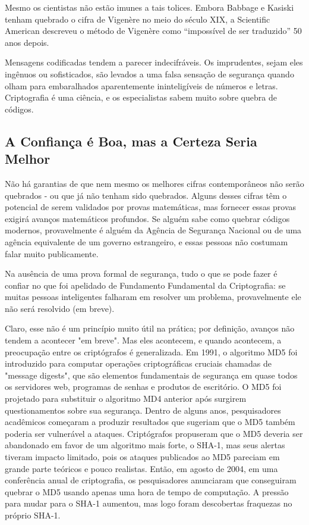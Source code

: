 \documentclass{book}
\begin{document}
Mesmo os cientistas não estão imunes a tais tolices. Embora Babbage e Kasiski tenham quebrado o cifra de Vigenère no meio do século XIX, a Scientific American descreveu o método de Vigenère como ``impossível de ser traduzido'' 50 anos depois.

Mensagens codificadas tendem a parecer indecifráveis. Os imprudentes, sejam eles ingênuos ou sofisticados, são levados a uma falsa sensação de segurança quando olham para embaralhados aparentemente ininteligíveis de números e letras. Criptografia é uma ciência, e os especialistas sabem muito sobre quebra de códigos.


\subsection{A Confiança é Boa, mas a Certeza Seria Melhor}
\label{segredos:confianca}

Não há garantias de que nem mesmo os melhores cifras contemporâneos não serão quebrados - ou que já não tenham sido quebrados. Alguns desses cifras têm o potencial de serem validados por provas matemáticas, mas fornecer essas provas exigirá avanços matemáticos profundos. Se alguém sabe como quebrar códigos modernos, provavelmente é alguém da Agência de Segurança Nacional ou de uma agência equivalente de um governo estrangeiro, e essas pessoas não costumam falar muito publicamente.

Na ausência de uma prova formal de segurança, tudo o que se pode fazer é confiar no que foi apelidado de Fundamento Fundamental da Criptografia: se muitas pessoas inteligentes falharam em resolver um problema, provavelmente ele não será resolvido (em breve).

Claro, esse não é um princípio muito útil na prática; por definição, avanços não tendem a acontecer "em breve". Mas eles acontecem, e quando acontecem, a preocupação entre os criptógrafos é generalizada. Em 1991, o algoritmo MD5 foi introduzido para computar operações criptográficas cruciais chamadas de "message digests", que são elementos fundamentais de segurança em quase todos os servidores web, programas de senhas e produtos de escritório. O MD5 foi projetado para substituir o algoritmo MD4 anterior após surgirem questionamentos sobre sua segurança. Dentro de alguns anos, pesquisadores acadêmicos começaram a produzir resultados que sugeriam que o MD5 também poderia ser vulnerável a ataques. Criptógrafos propuseram que o MD5 deveria ser abandonado em favor de um algoritmo mais forte, o SHA-1, mas seus alertas tiveram impacto limitado, pois os ataques publicados ao MD5 pareciam em grande parte teóricos e pouco realistas. Então, em agosto de 2004, em uma conferência anual de criptografia, os pesquisadores anunciaram que conseguiram quebrar o MD5 usando apenas uma hora de tempo de computação. A pressão para mudar para o SHA-1 aumentou, mas logo foram descobertas fraquezas no próprio SHA-1.
\end{document}
